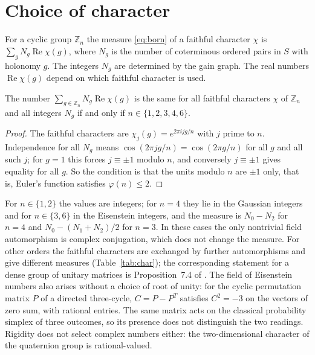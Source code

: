 \section{Choice of character}\label{sec:char}

For a cyclic group $\mathbb{Z}_n$ the measure \eqref{eq:born} of a faithful character $\chi$ is $\sum_{g}N_g\operatorname{Re}\chi(g)$, where $N_g$ is the number of coterminous ordered pairs in $S$ with holonomy $g$. The integers $N_g$ are determined by the gain graph. The real numbers $\operatorname{Re}\chi(g)$ depend on which faithful character is used.

\begin{proposition}\label{prop:rigid}
The number $\sum_{g\in\mathbb{Z}_n}N_g\operatorname{Re}\chi(g)$ is the same for all faithful characters $\chi$ of $\mathbb{Z}_n$ and all integers $N_g$ if and only if $n\in\{1,2,3,4,6\}$.
\end{proposition}
\begin{proof}
The faithful characters are $\chi_j(g)=e^{2\pi ijg/n}$ with $j$ prime to $n$. Independence for all $N_g$ means $\cos(2\pi jg/n)=\cos(2\pi g/n)$ for all $g$ and all such $j$; for $g=1$ this forces $j\equiv\pm1$ modulo $n$, and conversely $j\equiv\pm1$ gives equality for all $g$. So the condition is that the units modulo $n$ are $\pm1$ only, that is, Euler's function satisfies $\varphi(n)\le2$.
\end{proof}

For $n\in\{1,2\}$ the values are integers; for $n=4$ they lie in the Gaussian integers and for $n\in\{3,6\}$ in the Eisenstein integers, and the measure is $N_0-N_2$ for $n=4$ and $N_0-(N_1+N_2)/2$ for $n=3$. In these cases the only nontrivial field automorphism is complex conjugation, which does not change the measure. For other orders the faithful characters are exchanged by further automorphisms and give different measures (Table~\ref{tab:char}); the corresponding statement for a dense group of unitary matrices is Proposition~7.4 of \cite{g7}. The field of Eisenstein numbers also arises without a choice of root of unity: for the cyclic permutation matrix $P$ of a directed three-cycle, $C=P-P^{T}$ satisfies $C^2=-3$ on the vectors of zero sum, with rational entries. The same matrix acts on the classical probability simplex of three outcomes, so its presence does not distinguish the two readings. Rigidity does not select complex numbers either: the two-dimensional character of the quaternion group is rational-valued.

